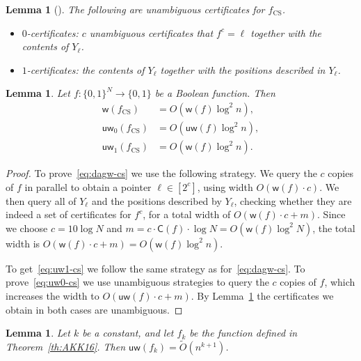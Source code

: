 \documentclass[11pt]{article}
\newcommand{\fcs}{f_{\mathrm{CS}}}
\newcommand{\dagw}{\mathsf{w}}
\newcommand{\cert}{\mathsf{C}}
\newcommand{\uw}{\mathsf{uw}}
\newcommand{\set}[1]{\{#1\}}
\numberwithin{equation}{section}
\newtheorem{lemma}[theorem]{Lemma}
\begin{document}
\begin{lemma}[\cite{AKK16}]
  \label{lem:unambiguous-cheatsheet}
  The following are unambiguous certificates for $\fcs$.
  \begin{itemize}
  \item $0$-certificates: $c$ unambiguous certificates that $f^c=\ell$ together with the contents of $Y_\ell$.
  \item $1$-certificates: the contents of $Y_\ell$ together with the positions described in $Y_\ell$.
  \end{itemize}
\end{lemma}

\begin{lemma}
  \label{lem:width-cheatsheet}
  Let $f\colon \set{0,1}^N\to\set{0,1}$ be a Boolean function. Then
  \begin{align}
  \dagw(\fcs) &= O(\dagw(f) \log^2 n), \label{eq:dagw-cs}\\
  \uw_0(\fcs) &= O(\uw(f) \log^2 n), \label{eq:uw0-cs}\\
  \uw_1(\fcs) &= O(\dagw(f) \log^2 n). \label{eq:uw1-cs}
  \end{align}

\end{lemma}

\begin{proof}
  To prove~\eqref{eq:dagw-cs} we use the following strategy.
  We query the $c$ copies of $f$ in parallel to obtain a pointer $\ell\in[2^c]$, using width $O(\dagw(f)\cdot c)$. We then query all of $Y_\ell$ and the positions described by $Y_\ell$, checking whether they are indeed a set of certificates for $f^c$, for a total width of $O(\dagw(f)\cdot c+m)$.
%
  Since we choose $c=10\log N$ and $m=c\cdot \cert(f)\cdot\log N=O(\dagw(f)\log^2N)$, the total width is $O(\dagw(f)\cdot c+m)=O(\dagw(f)\log^2 n)$.

  To get~\eqref{eq:uw1-cs} we follow the same strategy as for~\eqref{eq:dagw-cs}.
  To prove~\eqref{eq:uw0-cs} we use unambiguous strategies to query the $c$ copies of $f$, which increases the width to $O(\uw(f)\cdot c+m)$. By Lemma~\ref{lem:unambiguous-cheatsheet} the certificates we obtain in both cases are unambiguous.
\end{proof}

\begin{lemma}
  \label{lem:dagAKK16}
  Let $k$ be a constant, and let $f_k$ be the function defined in Theorem~\ref{th:AKK16}. Then $\uw(f_k)=\tilde O(n^{k+1})$.
\end{lemma}
\end{document}
